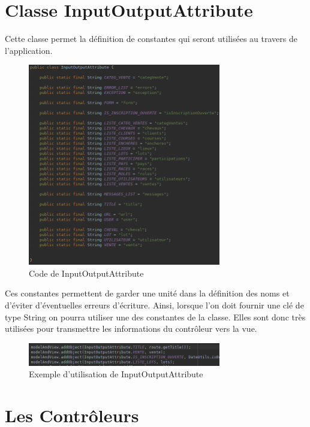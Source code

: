 	\newpage
	\section{Classe InputOutputAttribute}

		Cette classe permet la définition de constantes qui seront utilisées au travers de l'application.

		\begin{figure}[H]
			\centering\includegraphics[width=0.75\textwidth, keepaspectratio]{res/InputOutputAttribute.png}
			\caption{Code de InputOutputAttribute}
		\end{figure}

		Ces constantes permettent de garder une unité dans la définition des noms et d'éviter d'éventuelles erreurs d'écriture. Ainsi, lorsque l'on doit fournir une clé de type String on pourra utiliser une des constantes de la classe. Elles sont donc très utilisées pour transmettre les informations du contrôleur vers la vue.

		\begin{figure}[H]
			\centering\includegraphics[width=0.75\textwidth, keepaspectratio]{res/InputOutputAttribute-controller.png}
			\caption{Exemple d'utilisation de InputOutputAttribute}
		\end{figure}

	\newpage
	\section{Les Contrôleurs}

